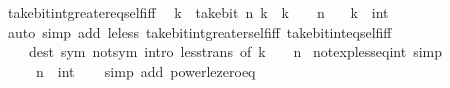 \begin{isabellebody}
{\isafoldproof}%
%
\isadelimproof
\isanewline
%
\endisadelimproof
\isanewline
{}\isamarkupfalse%
\ take{\isacharunderscore}{\kern0pt}bit{\isacharunderscore}{\kern0pt}int{\isacharunderscore}{\kern0pt}greater{\isacharunderscore}{\kern0pt}eq{\isacharunderscore}{\kern0pt}self{\isacharunderscore}{\kern0pt}iff{\isacharcolon}{\kern0pt}\isanewline
\ \ {\isacartoucheopen}k\ {\isasymle}\ take{\isacharunderscore}{\kern0pt}bit\ n\ k\ {\isasymlongleftrightarrow}\ k\ {\isacharless}{\kern0pt}\ {}\ {\isacharcircum}{\kern0pt}\ n{\isacartoucheclose}\isanewline
\ \ \ k\ {\isacharcolon}{\kern0pt}{\isacharcolon}{\kern0pt}\ int\isanewline
%
\isadelimproof
\ \ %
\endisadelimproof
%
\isatagproof
{}\isamarkupfalse%
\ {\isacharparenleft}{\kern0pt}auto\ simp\ add{\isacharcolon}{\kern0pt}\ le{\isacharunderscore}{\kern0pt}less\ take{\isacharunderscore}{\kern0pt}bit{\isacharunderscore}{\kern0pt}int{\isacharunderscore}{\kern0pt}greater{\isacharunderscore}{\kern0pt}self{\isacharunderscore}{\kern0pt}iff\ take{\isacharunderscore}{\kern0pt}bit{\isacharunderscore}{\kern0pt}int{\isacharunderscore}{\kern0pt}eq{\isacharunderscore}{\kern0pt}self{\isacharunderscore}{\kern0pt}iff\isanewline
\ \ \ \ dest{\isacharcolon}{\kern0pt}\ sym\ not{\isacharunderscore}{\kern0pt}sym\ intro{\isacharcolon}{\kern0pt}\ less{\isacharunderscore}{\kern0pt}trans\ {\isacharbrackleft}{\kern0pt}of\ k\ {}\ {\isacartoucheopen}{}\ {\isacharcircum}{\kern0pt}\ n{\isacartoucheclose}{\isacharbrackright}{\kern0pt}{\isacharparenright}{\kern0pt}%
\endisatagproof
{\isafoldproof}%
%
\isadelimproof
\isanewline
%
\endisadelimproof
\isanewline
{}\isamarkupfalse%
\ not{\isacharunderscore}{\kern0pt}exp{\isacharunderscore}{\kern0pt}less{\isacharunderscore}{\kern0pt}eq{\isacharunderscore}{\kern0pt}{}{\isacharunderscore}{\kern0pt}int\ {\isacharbrackleft}{\kern0pt}simp{\isacharbrackright}{\kern0pt}{\isacharcolon}{\kern0pt}\isanewline
\ \ {\isacartoucheopen}{\isasymnot}\ {}\ {\isacharcircum}{\kern0pt}\ n\ {\isasymle}\ {\isacharparenleft}{\kern0pt}{}{\isacharcolon}{\kern0pt}{\isacharcolon}{\kern0pt}int{\isacharparenright}{\kern0pt}{\isacartoucheclose}\isanewline
%
\isadelimproof
\ \ %
\endisadelimproof
%
\isatagproof
{}\isamarkupfalse%
\ {\isacharparenleft}{\kern0pt}simp\ add{\isacharcolon}{\kern0pt}\ power{\isacharunderscore}{\kern0pt}le{\isacharunderscore}{\kern0pt}zero{\isacharunderscore}{\kern0pt}eq{\isacharparenright}{\kern0pt}%
\endisatagproof
{\isafoldproof}%
%
\isadelimproof
\isanewline
%
\endisadelimproof

\end{isabellebody}
